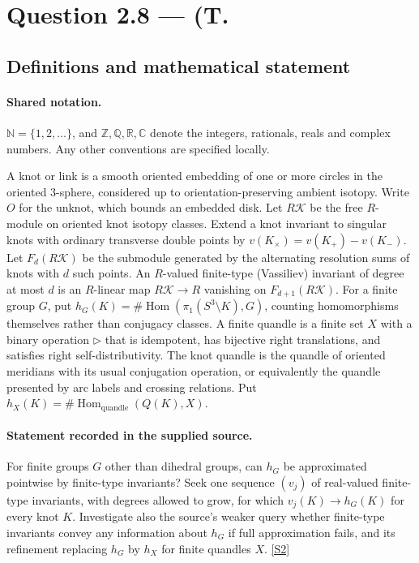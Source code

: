 \documentclass[11pt]{article}
\newcommand{\sref}[2]{\hyperlink{source:#1:#2}{[S#2]}}
\begin{document}
\section{Question 2.8 — (T.}\label{statement}

\subsection{Definitions and mathematical statement}

\paragraph{Shared notation.}$\mathbb N=\{1,2,\ldots\}$, and $\mathbb Z,\mathbb Q,\mathbb R,\mathbb C$ denote the integers, rationals, reals and complex numbers. Any other conventions are specified locally.


A knot or link is a smooth oriented embedding of one or more circles in the oriented $3$-sphere, considered up to orientation-preserving ambient isotopy. Write $O$ for the unknot, which bounds an embedded disk. Let $R\mathcal K$ be the free $R$-module on oriented knot isotopy classes. Extend a knot invariant to singular knots with ordinary transverse double points by $v(K_\times)=v(K_+)-v(K_-)$. Let $F_d(R\mathcal K)$ be the submodule generated by the alternating resolution sums of knots with $d$ such points. An $R$-valued finite-type (Vassiliev) invariant of degree at most $d$ is an $R$-linear map $R\mathcal K\to R$ vanishing on $F_{d+1}(R\mathcal K)$. For a finite group $G$, put $h_G(K)=\#\operatorname{Hom}(\pi_1(S^3\setminus K),G)$, counting homomorphisms themselves rather than conjugacy classes. A finite quandle is a finite set $X$ with a binary operation $\triangleright$ that is idempotent, has bijective right translations, and satisfies right self-distributivity. The knot quandle is the quandle of oriented meridians with its usual conjugation operation, or equivalently the quandle presented by arc labels and crossing relations. Put $h_X(K)=\#\operatorname{Hom}_{\mathrm{quandle}}(Q(K),X)$.
\paragraph{Statement recorded in the supplied source.}
For finite groups $G$ other than dihedral groups, can $h_G$ be approximated pointwise by finite-type invariants? Seek one sequence $(v_j)$ of real-valued finite-type invariants, with degrees allowed to grow, for which $v_j(K)\to h_G(K)$ for every knot $K$. Investigate also the source's weaker query whether finite-type invariants convey any information about $h_G$ if full approximation fails, and its refinement replacing $h_G$ by $h_X$ for finite quandles $X$. \sref{statement}{2}
\end{document}
